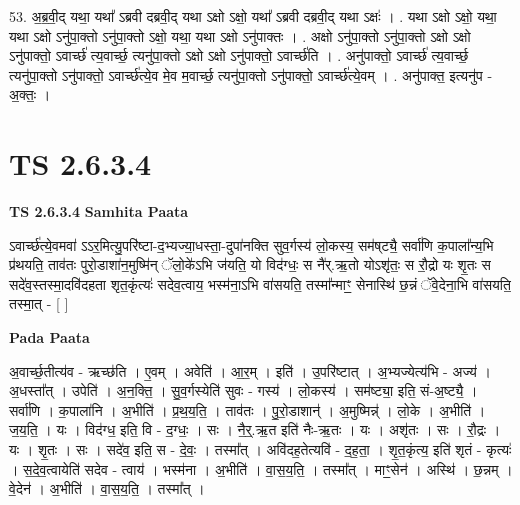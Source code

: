 \documentclass[17pt]{extarticle}
\begin{document}
53. अ॒ब्र॒वी॒द् यथा॒ यथा᳚ ऽब्रवी दब्रवी॒द् यथा ऽक्षो ऽक्षो॒ यथा᳚ ऽब्रवी दब्रवी॒द् यथा ऽक्षः॑ । . यथा ऽक्षो ऽक्षो॒ यथा॒ यथा ऽक्षो ऽनु॑पा॒क्तो ऽनु॑पा॒क्तो ऽक्षो॒ यथा॒ यथा ऽक्षो ऽनु॑पाक्तः । . अक्षो ऽनु॑पा॒क्तो ऽनु॑पा॒क्तो ऽक्षो ऽक्षो ऽनु॑पाक्तो॒ ऽवार्च्छ॑ त्य॒वार्च्छ॒ त्यनु॑पा॒क्तो ऽक्षो ऽक्षो ऽनु॑पाक्तो॒ ऽवार्च्छ॑ति । . अनु॑पाक्तो॒ ऽवार्च्छ॑ त्य॒वार्च्छ॒ त्यनु॑पा॒क्तो ऽनु॑पाक्तो॒ ऽवार्च्छ॑त्ये॒व मे॒व म॒वार्च्छ॒ त्यनु॑पा॒क्तो ऽनु॑पाक्तो॒ ऽवार्च्छ॑त्ये॒वम् । . अनु॑पाक्त॒ इत्यनु॑प - अ॒क्तः॒ । \newline
\pagebreak
{}

\section{ TS 2.6.3.4 }

\textbf{TS 2.6.3.4 } \newline
\textbf{Samhita Paata} \newline

ऽवार्च्छ॑त्ये॒वमवा॑ ऽऽर॒मित्यु॒परि॑ष्टा-द॒भ्यज्या॒धस्ता॒-दुपा॑नक्ति सुव॒र्गस्य॑ लो॒कस्य॒ सम॑ष्‌ट्यै॒ सर्वा॑णि क॒पाला᳚न्य॒भि प्र॑थयति॒ ताव॑तः पुरो॒डाशा॑न॒मुष्मि॑न् ॅलो॒के॑ऽभि ज॑यति॒ यो विद॑ग्धः॒ स नै॑र्.ऋ॒तो योऽशृ॑तः॒ स रौ॒द्रो यः शृ॒तः स सदे॑व॒स्तस्मा॒दवि॑दहता शृत॒कृंत्यः॑ सदेव॒त्वाय॒ भस्म॑ना॒ऽभि वा॑सयति॒ तस्मा᳚न्माꣳ॒॒ सेनास्थि॑ छ॒न्नं ॅवे॒देना॒भि वा॑सयति॒ तस्मा॒त् - [  ] \newline

\textbf{Pada Paata} \newline

अ॒वार्च्छ॒तीत्य॑व - ऋच्छ॑ति । ए॒वम् । अवेति॑ । आ॒र॒म् । इति॑ । उ॒परि॑ष्टात् । अ॒भ्यज्येत्य॑भि - अज्य॑ । अ॒धस्ता᳚त् । उपेति॑ । अ॒न॒क्ति॒ । सु॒व॒र्गस्येति॑ सुवः - गस्य॑ । लो॒कस्य॑ । सम॑ष्ट्या॒ इति॒ सं-अ॒ष्ट्यै॒ । सर्वा॑णि । क॒पाला॑नि । अ॒भीति॑ । प्र॒थ॒य॒ति॒ । ताव॑तः । पु॒रो॒डाशान्॑ । अ॒मुष्मिन्न्॑ । लो॒के । अ॒भीति॑ । ज॒य॒ति॒ । यः । विद॑ग्ध॒ इति॒ वि - द॒ग्धः॒ । सः । नै॒र्॒.ऋ॒त इति॑ नैः-ऋ॒तः । यः । अशृ॑तः । सः । रौ॒द्रः । यः । शृ॒तः । सः । सदे॑व॒ इति॒ स - दे॒वः॒ । तस्मा᳚त् । अवि॑दह॒तेत्यवि॑ - द॒ह॒ता॒ । शृ॒त॒कृंत्य॒ इति॑ शृतं - कृत्यः॑ । स॒दे॒व॒त्वायेति॑ सदेव - त्वाय॑ । भस्म॑ना । अ॒भीति॑ । वा॒स॒य॒ति॒ । तस्मा᳚त् । माꣳ॒॒सेन॑ । अस्थि॑ । छ॒न्नम् । वे॒देन॑ । अ॒भीति॑ । वा॒स॒य॒ति॒ । तस्मा᳚त् ।  \newline
\end{document}
